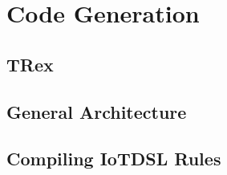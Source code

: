 \section{Code Generation}
\label{sec:CG}

\subsection{TRex}
\label{sec:CG-TRex}


\subsection{General Architecture}
\label{sec:CG-Architecture}


\subsection{Compiling IoTDSL Rules}
\label{sec:CG-Compilation}


